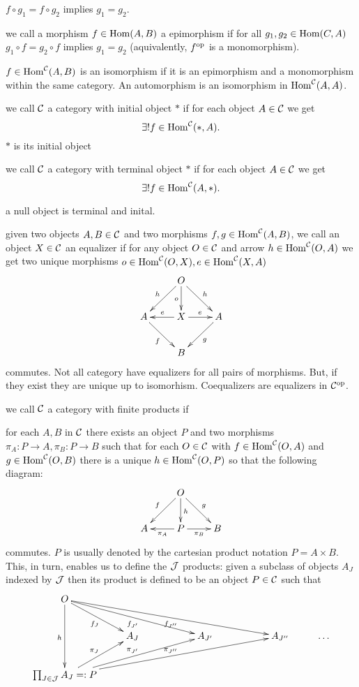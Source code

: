 $f \circ g_1 = f \circ g_2$ implies $g_1 = g_2$.
\item[epimorphims] we call a morphism $f \in \mathrm{Hom}(A,B)$ a epimorphism if for all $g_1, g_2 \in \mathrm{Hom}(C,A)$
$g_1 \circ f = g_2 \circ f$ implies $g_1 = g_2$ (aquivalently, ${f}^{\rm{op}}$ is a monomorphism).
\item[isomorphisms] $f \in \mathrm{Hom}^{\mathcal{C}}(A,B)$ is an isomorphism if it is an epimorphism and a monomorphism within the same category. An automorphism is an isomorphism in $\mathrm{Hom}^{\mathcal{C}}(A,A)$.
\item[initial] we call $\mathcal{C}$ a category with initial object $\ast$ if for each object $A \in \mathcal{C}$ we get
$$\exists ! f \in \mathrm{Hom}^{\mathcal{C}}(\ast,A).$$
$\ast$ is its initial object
\item[terminal] we call $\mathcal{C}$ a category with terminal object $\ast$ if for each object $A \in \mathcal{C}$ we
get
$$\exists ! f \in \mathrm{Hom}^{\mathcal{C}}(A,\ast).$$
\item[null] a null object is terminal and inital.
\item[equalizer] given two objects $A, B \in \mathcal{C}$ and two morphisms $f, g \in \mathrm{Hom}^{\mathcal{C}}(A,B)$, we call an object $X \in \mathcal{C}$ an equalizer if for any object $O \in \mathcal{C}$ and arrow $h \in \mathrm{Hom}^{\mathcal{C}}(O,A)$ we get two unique morphisms $o \in \mathrm{Hom}^{\mathcal{C}}(O,X), e \in \mathrm{Hom}^{\mathcal{C}}(X,A)$ 
$$\xymatrix{
&O\ar[rd]^h\ar[ld]_h\ar[d]_o&\\
A\ar[rd]_f&X\ar[l]_e\ar[r]^e&A\ar[ld]^g\\
&B&\\
}$$
commutes. Not all category have equalizers for all pairs of morphisms. But, if they exist they are unique up to isomorhism. Coequalizers are equalizers in ${\mathcal{C}}^{\rm{op}}$.
\item[products] we call $\mathcal{C}$ a category with finite products if 
\bn
\item for each $A, B$ in $\mathcal{C}$ there exists an object $P$ and two morphisms $\pi_A : P \longrightarrow A, \pi_B : P \longrightarrow B$ such that for each $O \in \mathcal{C}$ with $f \in \mathrm{Hom}^{\mathcal{C}}(O,A)$ and $g \in \mathrm{Hom}^{\mathcal{C}}(O,B)$ there is a unique $h \in \mathrm{Hom}^{\mathcal{C}}(O,P)$ so that the following diagram:
$$\xymatrix{
&O\ar[d]^h\ar[dl]_f\ar[dr]^g&\\
A&P\ar[l]^{\pi_A}\ar[r]_{\pi_B}&B\\
}$$
commutes. $P$ is usually denoted by the cartesian product notation $P = A \times B$. This, in turn, enables us to define the $\mathcal{J}$ products: given a subclass of objects $A_J$ indexed by $\mathcal{J}$ then its product is defined to be an object $P \in \mathcal{C}$ such that
$$\xymatrix{
O \ar[dd]_{h}\ar[rd]_{f_J}\ar[rrrd]_{f_{J'}}\ar[rrrrrd]_{f_{J''}}\\
&A_J && A_{J'} && A_{J''}&\ldots\\
\prod_{J \in \call{J}} A_J =: P\ar[ur]^{\pi_J} \ar[urrr]^{\pi_{J'}}\ar[urrrrr]^{\pi_{J''}}\\
}$$
